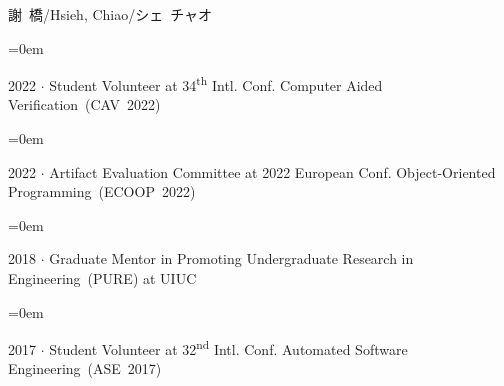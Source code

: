 \documentclass[letterpaper, UTF8]{scrartcl}
\newcommand{\MarginText}[1]{\marginpar{\raggedleft\itshape\small#1}} %
\newcommand{\Description}[1]{\hangindent=0em\hangafter=0\noindent\raggedright\footnotesize{#1}\par\normalsize\vspace{0.3em}}
\newcommand{\newsectsep}{\vspace{0.9em}}
\newcommand{\reducesep}{\vspace{-0.3em}}
\begin{document}
\begin{CJK}{UTF8}{kai}
\begin{cv}{謝~橋/Hsieh, Chiao/シェ~チャオ}
\vspace{0.5em}

\Description{2022 $\cdot$ Student Volunteer at 34\textsuperscript{th} Intl. Conf. Computer Aided Verification~(CAV~2022)}

\reducesep

\Description{2022 $\cdot$ Artifact Evaluation Committee at 2022 European Conf. Object-Oriented Programming~(ECOOP~2022)}

\reducesep

\Description{2018 $\cdot$ Graduate Mentor in Promoting Undergraduate Research in Engineering~(PURE) at UIUC}

\reducesep

\Description{2017 $\cdot$ Student Volunteer at 32\textsuperscript{nd} Intl. Conf. Automated Software Engineering~(ASE~2017)}




\begin{comment}
\spacedlowsmallcaps{Other Information}\vspace{0.5em}

\Description{\MarginText{Presentations}2021 $\cdot$ 15 min. presentation for SkyTrakx at ITSC~2021}

\reducesep

\Description{2020, 2021 $\cdot$ 20 min. presentation for Koord at OOPSLA~2020 and SPLASH~2021}

\reducesep

\Description{2019 $\cdot$ 30 min. presentation for Dione at iFM~2019}

\reducesep

\Description{2015 $\cdot$ 5 min. tool paper presentation at TACAS~2015}

\reducesep

\Description{2014 $\cdot$ 20 min. research paper presentation at SAS 2014}




\newlength{\langbox} %
\settowidth{\langbox}{English} %


\end{comment}
\end{cv}
\end{CJK}
\end{document}
